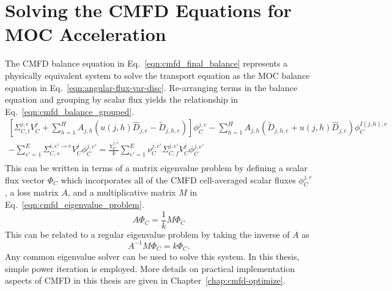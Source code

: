\section{Solving the CMFD Equations for MOC Acceleration}
The \ac{CMFD} balance equation in Eq.~\ref{eqn:cmfd_final_balance} represents a physically equivalent system to solve the transport equation as the \ac{MOC} balance equation in Eq.~\ref{eqn:angular-flux-var-disc}. Re-arranging terms in the balance equation and grouping by scalar flux yields the relationship in Eq.~\ref{eqn:cmfd_balance_grouped}.
\begin{equation}
	\begin{split}
		\left[\Sigma_{C,t}^{j,e} V_C^j + \sum_{h=1}^H A_{j,h} \left(u(j,h) \hat{D}_{j,e} - \tilde{D}_{j,h,e} \right) \right] \phi_C^{j,e} - \sum_{h=1}^H A_{j,h} \left( \tilde{D}_{j,h,e} + u(j,h) \hat{D}_{j,e} \right) \phi_C^{I(j,h),e} & \\ - \sum_{e'=1}^E  \Sigma_{C,s}^{i, e' \rightarrow e} V_C^j \phi_C^{j,e'} =
		\frac{\chi_C^{j,e}}{k} \sum_{e'=1}^{E} \nu_C^{j, e'} \Sigma_{C,f}^{j,e'} V_C^j \phi_C^{j,e'} & \\
	\end{split}
	\label{eqn:cmfd_balance_grouped}
\end{equation}
This can be written in terms of a matrix eigenvalue problem by defining a scalar flux vector $\Phi_C$ which incorporates all of the \ac{CMFD} cell-averaged scalar fluxes $\phi_C^{j,e}$, a loss matrix $A$, and a multiplicative matrix $M$ in Eq.~\ref{eqn:cmfd_eigenvalue_problem}.
\begin{equation}
	A \Phi_C = \frac{1}{k} M \Phi_C
	\label{eqn:cmfd_eigenvalue_problem}
\end{equation}
This can be related to a regular eigenvalue problem by taking the inverse of $A$ as
\begin{equation}
	A^{-1} M \Phi_C = k \Phi_C.
\end{equation}
Any common eigenvalue solver can be used to solve this system. In this thesis, simple power iteration is employed. More details on practical implementation aspects of \ac{CMFD} in this thesis are given in Chapter~\ref{chap:cmfd-optimize}.

